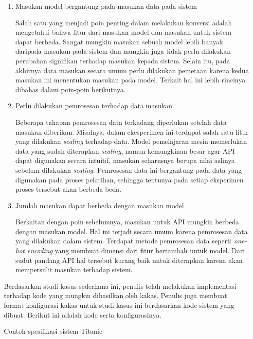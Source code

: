 \begin{enumerate}
	\item Masukan model bergantung pada masukan data pada sistem 
	
	Salah satu yang menjadi poin penting dalam melakukan konversi adalah mengetahui bahwa fitur dari masukan model dan masukan untuk sistem dapat berbeda.
	Sangat mungkin masukan sebuah model lebih banyak daripada masukan pada sistem dan mungkin juga tidak perlu dilakukan perubahan signifikan terhadap masukan kepada sistem.
	Selain itu, pada akhirnya data masukan secara umum perlu dilakukan pemetaan karena kedua masukan ini menentukan masukan pada model.
	Terkait hal ini lebih rincinya dibahas dalam poin-poin berikutnya.

	\item Perlu dilakukan pemrosesan terhadap data masukan
	
	Beberapa tahapan pemrosesan data terkadang diperlukan setelah data masukan diberikan.
	Misalnya, dalam ekesperimen ini terdapat salah satu fitur yang dilakukan \textit{scaling} terhadap data.
	Model pemelajaran mesin memerlukan data yang sudah diterapkan \textit{scaling}, namun kemungkinan besar agar API dapat digunakan secara intuitif, masukan seharusnya berupa nilai aslinya sebelum dilakukan \textit{scaling}.
	Pemrosesan data ini bergantung pada data yang digunakan pada proses pelatihan, sehingga tentunya pada setiap eksperimen proses tersebut akan berbeda-beda.
	
	\item Jumlah masukan dapat berbeda dengan masukan model
	
	Berkaitan dengan poin sebelumnya, masukan untuk API mungkin berbeda dengan masukan model.
	Hal ini terjadi secara umum karena pemrosesan data yang dilakukan dalam sistem.
	Terdapat metode pemrosesan data seperti \textit{one-hot encoding} yang membuat dimensi dari fitur bertambah untuk model.
	Dari sudut pandang API hal tersebut kurang baik untuk diterapkan karena akan mempersulit masukan terhadap sistem.
\end{enumerate}

Berdasarkan studi kasus sederhana ini, penulis telah melakukan implementasi terhadap kode yang mungkin dihasilkan oleh kakas.
Penulis juga membuat format konfigurasi kakas untuk studi kasus ini berdasarkan kode sistem yang dibuat.
Berikut ini adalah kode serta konfigurasinya.

\begin{listing}[H]
	\caption{Contoh spesifikasi sistem Titanic}
	\label{listing:14}
\end{listing}

